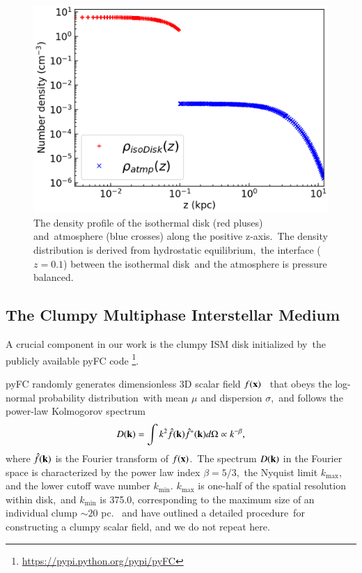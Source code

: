 \documentclass[twocolumn]{aastex631}
\begin{document}
  \begin{figure}
    \includegraphics[width=\columnwidth]{figures/fig__initial-density-profile.png}
    \caption{The density profile of the isothermal disk (red pluses) and\
             atmosphere (blue crosses) along the positive z-axis.\
             The density distribution is derived from hydrostatic equilibrium,\
             the interface ($z=0.1$) between the isothermal disk\
             and the atmosphere is pressure balanced.}
    \label{fig__initial-density-profile}
  \end{figure}






  \subsection{The Clumpy Multiphase Interstellar Medium}

  A crucial component in our work is the clumpy ISM disk initialized by\
  the publicly available pyFC code
  \footnote{\url{https://pypi.python.org/pypi/pyFC}}.\

  pyFC randomly generates dimensionless 3D scalar field $f(\bold{x})$\ %
  that obeys the log-normal probability distribution\
  with mean $\mu$ and dispersion $\sigma$,\
  and follows the power-law Kolmogorov spectrum
  \begin{equation}
    D(\bold{k})=\int k^{2} \hat{f}(\bold{k})\hat{f}^{*}(\bold{k})d\Omega \propto k^{-\beta},
    \label{Kolmogorov-spectrum}
  \end{equation}
  where $\hat{f}(\bold{k})$ is the Fourier transform of $f(\bold{x})$.\
  The spectrum $D(\bold{k})$ in the Fourier space is characterized by the power law index $\beta=5/3$,\
  the Nyquist limit $k_{\text{max}}$, and the lower cutoff wave number $k_{\text{min}}$.
  $k_{\text{max}}$ is one-half of the spatial resolution within disk,\
  and $k_{\text{min}}$ is 375.0, corresponding to the maximum size of an individual clump $\sim 20$ pc.\
  \citet{LA2002} and \citet{Wagner2012} have outlined a detailed procedure\
  for constructing a clumpy scalar field, and we do not repeat here.
\end{document}
